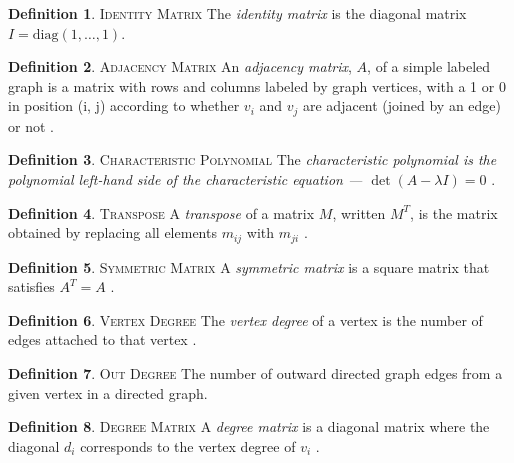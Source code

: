 \documentclass[11pt]{article}
\theoremstyle{definition}
\newtheorem{definition}{Definition}[section]
\begin{document}
	\theoremstyle{definition}
	\begin{definition}{\textsc{Identity Matrix}}
		The \emph{identity matrix} is the diagonal matrix $I = \text{diag}(1, \dots, 1)$.
	\end{definition}
	
	\theoremstyle{definition}
	\begin{definition}{\textsc{Adjacency Matrix}}
		An \emph{adjacency matrix}, $A$, of a simple labeled graph is a matrix with rows and columns labeled by graph vertices, with a 1 or 0 in position (i, j) according to whether $v_i$ and $v_j$ are adjacent (joined by an edge) or not \cite{mathworld:AdjacencyMatrix}. 
	\end{definition}
	
	\theoremstyle{definition}
	\begin{definition}{\textsc{Characteristic Polynomial}}
		The \emph{characteristic polynomial is the polynomial left-hand side of the characteristic equation --- $\det(A - \lambda I) = 0$} \cite{mathworld:CharacteristicPoly}.
	\end{definition}
	
	\theoremstyle{definition}
	\begin{definition}{\textsc{Transpose}}
		A \emph{transpose} of a matrix $M$, written $M^T$, is the matrix obtained by replacing all elements $m_{ij}$ with $m_{ji}$ \cite{mathworld:Transpose}.
	\end{definition}
	
	\theoremstyle{definition}
	\begin{definition}{\textsc{Symmetric Matrix}}
		A \emph{symmetric matrix} is a square matrix that satisfies $A^T = A$ \cite{mathworld:SymmetricMatrix}.
	\end{definition}
	
	\theoremstyle{definition}
	\begin{definition}{\textsc{Vertex Degree}}
		The \emph{vertex degree} of a vertex is the number of edges attached to that vertex \cite{mathworld:VertexDegree}.
	\end{definition}
	
	\theoremstyle{definition}
	\begin{definition}{\textsc{Out Degree}}
		The number of outward directed graph edges from a given vertex in a directed graph.
	\end{definition}
	
	\theoremstyle{definition}
	\begin{definition}{\textsc{Degree Matrix}}
		A \emph{degree matrix} is a diagonal matrix where the diagonal $d_i$ corresponds to the vertex degree of $v_i$ \cite{mathworld:DegreeMatrix}. 
	\end{definition}
	
\end{document}
